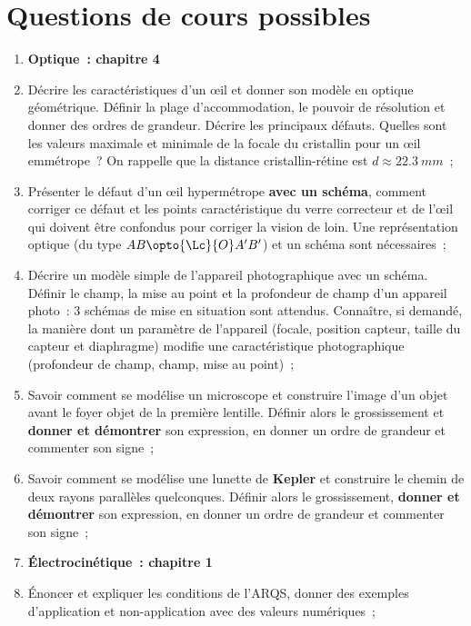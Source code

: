 \documentclass[a4paper, 12pt, final, garamond]{book}
\begin{document}
\section{Questions de cours possibles}
\begin{enumerate}
  \item[] \textbf{Optique~: chapitre 4}
	\item Décrire les caractéristiques d'un œil et donner son modèle en optique
	      géométrique. Définir la plage d'accommodation, le pouvoir de résolution
	      et donner des ordres de grandeur. Décrire les principaux défauts.
        Quelles sont les valeurs maximale et minimale de la focale du
        cristallin pour un œil emmétrope~? On rappelle que la distance
        cristallin-rétine est $d \approx \SI{22.3}{mm}$~;
  \item Présenter le défaut d'un œil hypermétrope \textbf{avec un schéma},
        comment corriger ce défaut et les points caractéristique du verre
        correcteur et de l'œil qui doivent être confondus pour corriger la
        vision de loin. Une représentation optique (du type $AB \opto{\Lc}{O}
        A'B'$) et un schéma sont nécessaires~;
  \item Décrire un modèle simple de l'appareil photographique avec un schéma.
        Définir le champ, la mise au point et la profondeur de champ d'un
        appareil photo~: 3 schémas de mise en situation sont attendus.
        Connaître, si demandé, la manière dont un paramètre de l'appareil
        (focale, position capteur, taille du capteur et diaphragme) modifie une
        caractéristique photographique (profondeur de champ, champ, mise au
        point)~;
  \item Savoir comment se modélise un microscope et construire l'image d'un
        objet avant le foyer objet de la première lentille. Définir alors le
        grossissement et \textbf{donner et démontrer} son expression, en donner
        un ordre de grandeur et commenter son signe~;
  \item Savoir comment se modélise une lunette de \textbf{Kepler} et
        construire le chemin de deux rayons parallèles quelconques. Définir
        alors le grossissement, \textbf{donner et démontrer} son expression, en
        donner un ordre de grandeur et commenter son signe~;
  \item[] \textbf{Électrocinétique~: chapitre 1}
  \item Énoncer et expliquer les conditions de l'ARQS, donner des exemples
        d'application et non-application avec des valeurs numériques~;

\end{enumerate}
\end{document}
